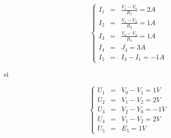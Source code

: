 \begin{equation}
\left\{
\begin{array}{ccl} %
I_1 & = & \frac{V_1 - V_0}{R_1} = 2A \\
I_2 & = & \frac{V_1 - V_2}{R_2} = 1A \\
I_3 & = & \frac{V_0 - V_2}{R_3} = 1A \\
I_4 & = & J_4 = 3A \\
I_5 & = & I_3 - I_1 = -1A
\end{array}  
\right. \nonumber %
\end{equation}

si 

\begin{equation}
\left\{
\begin{array}{ccl} %
U_1 & = & V_0 - V_1 = 1V \\
U_2 & = & V_1 - V_2 = 2V \\
U_3 & = & V_2 - V_0 = -1V \\
U_4 & = & V_1 - V_2 = 2V \\
U_5 & = & E_5 = 1V
\end{array}  
\right. \nonumber %
\end{equation}
